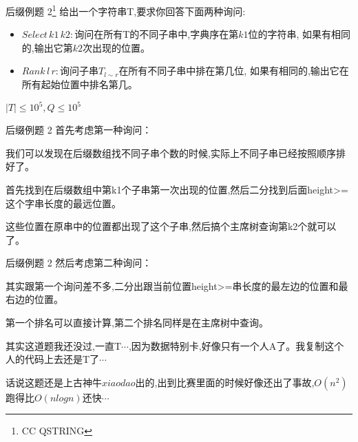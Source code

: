 \documentclass[10pt]{beamer}
\begin{document}
	\begin{frame}{后缀例题 2\footnote{CC QSTRING}}
		给出一个字符串T,要求你回答下面两种询问:

		\vspace{2ex}

		\begin{itemize}
			\item $Select \, k1 \, k2:$询问在所有T的不同子串中,字典序在第$k1$位的字符串,
					如果有相同的,输出它第$k2$次出现的位置。

			\vspace{2ex}

			\item $Rank \, l \, r:$询问子串$T_{l \sim r}$在所有不同子串中排在第几位,
					如果有相同的,输出它在所有起始位置中排名第几。
		\end{itemize}

		\vspace{2ex}

		$|T| \leq 10^5, Q \leq 10^5$
	\end{frame}
	\begin{frame}{后缀例题 2}
		首先考虑第一种询问：

		\vspace{2ex}

		我们可以发现在后缀数组找不同子串个数的时候,实际上不同子串已经按照顺序排好了。\pause

		首先找到在后缀数组中第k1个子串第一次出现的位置,然后二分找到后面height>=这个字串长度的最远位置。

		这些位置在原串中的位置都出现了这个子串,然后搞个主席树查询第k2个就可以了。

	\end{frame}
	\begin{frame}{后缀例题 2}
		然后考虑第二种询问：

		\vspace{2ex}

		其实跟第一个询问差不多,二分出跟当前位置height>=串长度的最左边的位置和最右边的位置。

		第一个排名可以直接计算,第二个排名同样是在主席树中查询。\pause

		\vspace{2ex}

		其实这道题我还没过,一直T$\cdots$,因为数据特别卡,好像只有一个人A了。我复制这个人的代码上去还是T了$\cdots$

		话说这题还是上古神牛$xiaodao$出的,出到比赛里面的时候好像还出了事故,$O(n^2)$跑得比$O(nlogn)$还快$\cdots$

	\end{frame}
\end{document}
